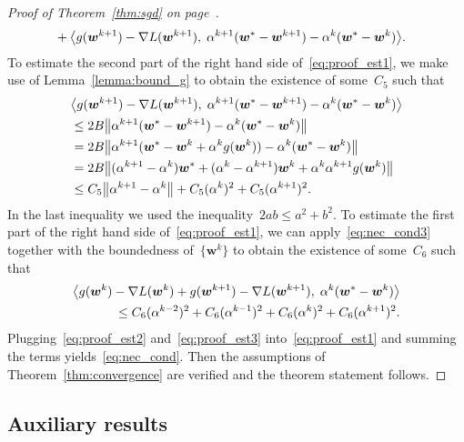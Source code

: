\begin{proof}[Proof of Theorem~\ref{thm:sgd} on page~\pageref{thm:sgd}]
\begin{equation}
\begin{aligned}
      & + \inner{ g(\bm{w}^{k+1})-\nabla L(\bm{w}^{k+1})}{\alpha^{k+1}(\bm{w}^*-\bm{w}^{k+1})-\alpha^k(\bm{w}^*-\bm{w}^{k})}.
    \end{aligned}
  \end{equation}
  To estimate the second part of the right hand side of~\eqref{eq:proof_est1}, we make use of Lemma~\ref{lemma:bound_g} to obtain the existence of some~$C_5$ such that
  \begin{equation}\label{eq:proof_est2}
    \begin{aligned}
    & \inner{ g(\bm{w}^{k+1})
    -\nabla L(\bm{w}^{k+1})}{\alpha^{k+1}(\bm{w}^*-\bm{w}^{k+1})-\alpha^k(\bm{w}^*-\bm{w}^{k})} \\
    & \leq 2B\norm{\alpha^{k+1}(\bm{w}^*-\bm{w}^{k+1})-\alpha^k(\bm{w}^*-\bm{w}^{k})} \\
    & = 2B\norm{\alpha^{k+1}(\bm{w}^*-\bm{w}^k+\alpha^kg(\bm{w}^k))-\alpha^k(\bm{w}^*-\bm{w}^{k})} \\
    & = 2B\norm{(\alpha^{k+1}-\alpha^k)\bm{w}^* + (\alpha^k-\alpha^{k+1})\bm{w}^k +\alpha^k\alpha^{k+1} g(\bm{w}^k)} \\
    & \leq C_5 \norm{\alpha^{k+1}-\alpha^k} + C_5(\alpha^k)^2 + C_5(\alpha^{k+1})^2.
    \end{aligned}
  \end{equation}
  In the last inequality we used the inequality~$2ab\leq a^2+b^2$. To estimate the first part of the right hand side of~\eqref{eq:proof_est1}, we can apply~\eqref{eq:nec_cond3} together with the boundedness of~$\{\bm{w}^k\}$ to obtain the existence of some~$C_6$ such that
  \begin{equation}\label{eq:proof_est3}
    \begin{aligned}
    \inner{ g(\bm{w}^{k}) -\nabla L(\bm{w}^{k}) + g(\bm{w}^{k+1})-\nabla L(\bm{w}^{k+1})}{\alpha^k(\bm{w}^* - \bm{w}^{k})} \\
      \leq C_6(\alpha^{k-2})^2 + C_6(\alpha^{k-1})^2 + C_6(\alpha^{k})^2 + C_6(\alpha^{k+1})^2.
      \end{aligned}
  \end{equation}
  Plugging~\eqref{eq:proof_est2} and~\eqref{eq:proof_est3} into~\eqref{eq:proof_est1} and summing the terms yields~\eqref{eq:nec_cond}. Then the assumptions of Theorem~\ref{thm:convergence} are verified and the theorem statement follows.
\end{proof}

\subsection{Auxiliary results}\label{app:sgd3}

